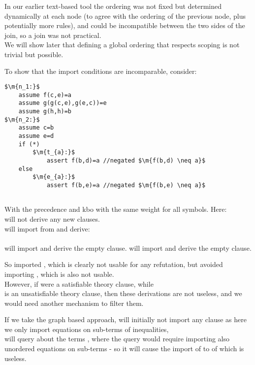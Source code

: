 In our earlier text-based tool the ordering was not fixed but determined dynamically at each node (to agree with the ordering of the previous node, plus potentially more rules), and could be incompatible between the two sides of the join, so a join was not practical.\\
We will show later that defining a global ordering that respects scoping is not trivial but possible.

\noindent
To show that the import conditions are incomparable, consider:
\begin{lstlisting}[caption=propagation condition comparison 2,label=snippet3.12]
$\m{n_1:}$
	assume f(c,e)=a
	assume g(g(c,e),g(e,c))=e
	assume g(h,h)=b
$\m{n_2:}$
	assume c=b
	assume e=d
	if (*)
		$\m{t_{a}:}$
			assert f(b,d)=a //negated $\m{f(b,d) \neq a}$
	else
		$\m{e_{a}:}$
			assert f(b,e)=a //negated $\m{f(b,e) \neq a}$
			
\end{lstlisting}

With the precedence  and kbo with the same weight for all symbols. Here:\\
 will not derive any new clauses.\\
 will import  from  and derive:\\
\\
 will import  and derive the empty clause.
 will import  and derive the empty clause.

So  imported , which is clearly not usable for any refutation, but avoided importing , which is also not usable.\\
However, if  were a satisfiable theory clause, while\\
  is an unsatisfiable theory clause, then these derivations are not useless, and we would need another mechanism to filter them.

If we take the graph based approach,  will initially not import any clause as here we only import equations on sub-terms of inequalities, \\
 will query about the terms , where the query would require importing also unordered equations on sub-terms -
so it will cause the import of  to  of which  is useless.

